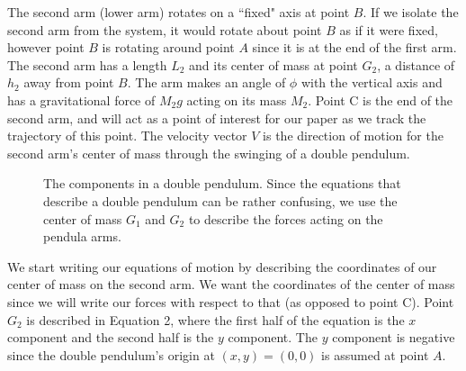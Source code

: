 \documentclass[%
 aip,
 amsmath,amssymb,
 reprint,%
 floatfix,%
]{revtex4-1}
\begin{document}
The second arm (lower arm) rotates on a ``fixed" axis at point $B$. If we isolate the second arm from the system, it would rotate about point $B$ as if it were fixed, however point $B$ is rotating around point $A$ since it is at the end of the first arm. The second arm has a length $L_2$ and its center of mass at point $G_2$, a distance of $h_2$ away from point $B$. The arm makes an angle of $\phi$ with the vertical axis and has a gravitational force of $M_2 g$ acting on its mass $M_2$. Point C is the end of the second arm, and will act as a point of interest for our paper as we track the trajectory of this point. The velocity vector $V$ is the direction of motion for the second arm's center of mass through the swinging of a double pendulum. 
\begin{figure}
	\centering
	\caption{The components in a double pendulum. Since the equations that describe a double pendulum can be rather confusing, we use the center of mass $G_1$ and $G_2$ to describe the forces acting on the pendula arms.}
\end{figure}

We start writing our equations of motion by describing the coordinates of our center of mass on the second arm. We want the coordinates of the center of mass since we will write our forces with respect to that (as opposed to point C). Point $G_2$ is described in Equation 2, where the first half of the equation is the $x$ component and the second half is the $y$ component. The $y$ component is negative since the double pendulum's origin at $(x,y)=(0,0)$ is assumed at point $A$.
\end{document}
